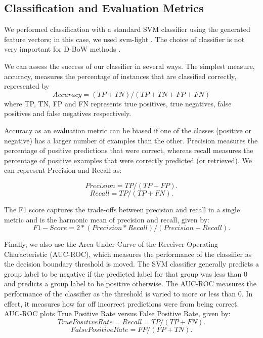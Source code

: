 \subsection{Classification and Evaluation Metrics}

We performed classification with a standard SVM classifier using the generated feature vectors; in this case, we used svm-light \cite{joachims08}. The choice of classifier is not very important for D-BoW methods \cite{amores13}.


We can assess the success of our classifier in several ways. The simplest measure, accuracy, measures the percentage of instances 
that are classified correctly, represented by 
\begin{equation}
Accuracy = (TP + TN)/ (TP + TN + FP + FN)  \label{eqn:acc} 
\end{equation}
where TP, TN, FP and FN represents true positives, true negatives, false positives and false negatives respectively.

Accuracy as an evaluation metric can be biased if one of the classes 
(positive or negative)  has a larger number of examples than the other.   
Precision measures the percentage of positive predictions that 
were correct, 
whereas recall measures the percentage of positive 
examples that were correctly predicted (or retrieved). 
We can represent Precision and Recall as:

\begin{equation}
Precision = TP / (TP + FP). \label{eqn:prec}
\end{equation}
\begin{equation}
Recall = TP / (TP +FN). \label{eqn:roc}
\end{equation}

The F1 score captures the trade-offs between precision and recall in a
single metric and is the harmonic mean of precision and recall, given by:
\begin{equation}
F1-Score = 2 * (Precision * Recall)/ (Precision + Recall). \label{eqn:f1}
\end{equation}

Finally, we also use the Area Under Curve of the Receiver Operating Characteristic (AUC-ROC), which measures the performance of the classifier as the decision boundary threshold is moved. The SVM classifier generally predicts a group label to be negative if the predicted label for that group was less than 0 and predicts a group label to be positive otherwise. The AUC-ROC measures the performance of the classifier as the threshold is varied to more or less than 0. In effect, it measures how far off incorrect predictions were from being correct. AUC-ROC plots True Positive Rate versus False Positive Rate, given by:
\begin{equation}
True Positive Rate = Recall = TP / (TP + FN). \label{eqn:roc}
\end{equation}
\begin{equation}
False Positive Rate = FP / (FP + TN). \label{eqn:prec}
\end{equation}
